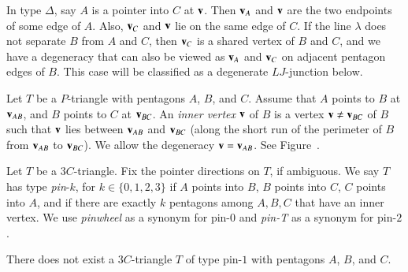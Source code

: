 In type $\Delta$, say $A$ is a pointer into $C$ at ${\mathbf v}$.  Then ${\mathbf v}_A$
and ${\mathbf v}$ are the two endpoints of some edge of $A$.  Also, ${\mathbf v}_C$ and
${\mathbf v}$ lie on the same edge of $C$.  If the line $\lambda$ does not
separate $B$ from $A$ and $C$, then ${\mathbf v}_C$ is a shared vertex of $B$
and $C$, and we have a degeneracy that can also be viewed as ${\mathbf v}_A$
and ${\mathbf v}_C$ on adjacent pentagon edges of $B$.  This case will be
classified as a degenerate $LJ$-junction below.

\begin{definition} Let $T$ be a $P$-triangle with pentagons $A$, $B$,
  and $C$.  Assume that $A$ points to $B$ at ${\mathbf v}_{AB}$, and $B$ points
  to $C$ at ${\mathbf v}_{BC}$.  An {\it inner vertex} ${\mathbf v}$ of $B$ is a vertex
  ${\mathbf v}\ne {\mathbf v}_{BC}$ of $B$ such that ${\mathbf v}$ lies between ${\mathbf v}_{AB}$ and
  ${\mathbf v}_{BC}$ (along the short run of the perimeter of $B$ from
  ${\mathbf v}_{AB}$ to ${\mathbf v}_{BC}$).  We allow the degeneracy ${\mathbf v}={\mathbf v}_{AB}$.
  See Figure~.
\end{definition}

\begin{definition} Let $T$ be a $3C$-triangle.  Fix the pointer
  directions on $T$, if ambiguous. We say $T$ has type {\it pin}-$k$,
  for $k\in \{0,1,2,3\}$ if $A$ points into $B$, $B$ points into $C$,
  $C$ points into $A$, and if there are exactly $k$ pentagons among
  $A,B,C$ that have an inner vertex.  We use {\it pinwheel} as a
  synonym for pin-$0$ and {\it pin-T} as a synonym for pin-$2$.
\end{definition}

\begin{lemma} There does not exist a $3C$-triangle $T$ of type pin-$1$
  with pentagons $A$, $B$, and $C$.
\end{lemma}


